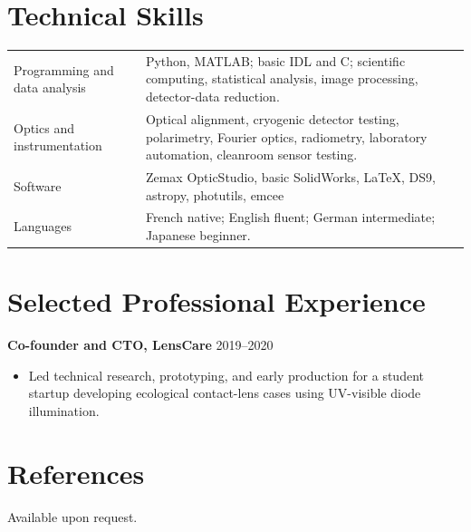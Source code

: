 \documentclass[11pt,letterpaper]{article}
\newcommand{\cvsubheading}[2]{%
  \textbf{#1} \hfill #2\par
}
\begin{document}
\section{Technical Skills}
\begin{tabularx}{\textwidth}{@{}l X@{}}
Programming and data analysis & Python, MATLAB; basic IDL and C; scientific computing, statistical analysis, image processing, detector-data reduction.\\
Optics and instrumentation & Optical alignment, cryogenic detector testing, polarimetry, Fourier optics, radiometry, laboratory automation, cleanroom sensor testing.\\
Software & Zemax OpticStudio, basic SolidWorks, LaTeX, DS9, astropy, photutils, emcee\\
Languages & French native; English fluent; German intermediate; Japanese beginner.\\
\end{tabularx}


\section{Selected Professional Experience}

\cvsubheading{Co-founder and CTO, LensCare}{2019--2020}
\begin{itemize}
  \item Led technical research, prototyping, and early production for a student startup developing ecological contact-lens cases using UV-visible diode illumination.
\end{itemize}


\section{References}
Available upon request.

\end{document}
